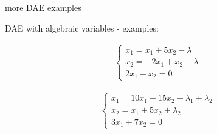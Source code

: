 \documentclass{beamer}
\begin{document}
\begin{frame}{more DAE examples}
	\begin{flushleft}
		
		DAE with algebraic variables - examples:
		
		\begin{align}
			\begin{cases}
				\dot x_1 = x_1 + 5 x_2 - \lambda\\
				\dot x_2 = -2x_1 + x_2 + \lambda\\
				2 x_1 - x_2 = 0
			\end{cases}
		\end{align}
		
		\begin{align}
			\begin{cases}
				\dot x_1 = 10x_1 + 15 x_2 - \lambda_1 + \lambda_2 \\
				\dot x_2 = x_1 + 5x_2 + \lambda_2 \\
				3 x_1 + 7 x_2 = 0
			\end{cases}
		\end{align}
		
		
	\end{flushleft}
\end{frame}

\myqrframe
\end{document}
